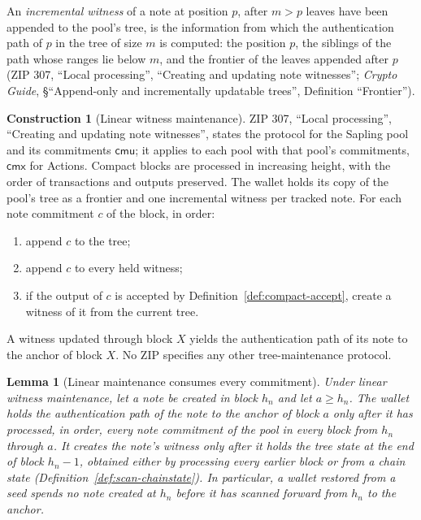 \documentclass[11pt,a4paper]{article}
\newtheorem{lemma}[theorem]{Lemma}
\theoremstyle{definition}
\newtheorem{construction}[theorem]{Construction}
\newcommand{\cmx}{\mathsf{cmx}}
\begin{document}
An \emph{incremental witness} of a note at position $p$, after $m > p$
leaves have been appended to the pool's tree, is the information from which
the authentication path of $p$ in the tree of size $m$ is computed: the
position $p$, the siblings of the path whose ranges lie below $m$, and the
frontier of the leaves appended after $p$ (ZIP 307, ``Local processing'',
``Creating and updating note witnesses''; \emph{Crypto Guide},
\S``Append-only and incrementally updatable trees'', Definition
``Frontier'').

\begin{construction}[Linear witness maintenance]
ZIP 307, ``Local processing'', ``Creating and updating note witnesses'',
states the protocol for the Sapling pool and its commitments
$\mathsf{cmu}$; it applies to each pool with that pool's commitments,
$\cmx$ for Actions. Compact blocks are processed in increasing height, with
the order of transactions and outputs preserved. The wallet holds its copy
of the pool's tree as a frontier and one incremental witness per tracked
note. For each note commitment $c$ of the block, in order:
\begin{enumerate}[label=(\roman*)]
\item append $c$ to the tree;
\item append $c$ to every held witness;
\item if the output of $c$ is accepted by
  Definition~\ref{def:compact-accept}, create a witness of it from the
  current tree.
\end{enumerate}
A witness updated through block $X$ yields the authentication path of its
note to the anchor of block $X$. No ZIP specifies any other
tree-maintenance protocol.
\end{construction}

\begin{lemma}[Linear maintenance consumes every commitment]%
\label{lem:tree-linear}
Under linear witness maintenance, let a note be created in block $h_n$ and
let $a \ge h_n$. The wallet holds the authentication path of the note to
the anchor of block $a$ only after it has processed, in order, every note
commitment of the pool in every block from $h_n$ through $a$. It creates
the note's witness only after it holds the tree state at the end of block
$h_n - 1$, obtained either by processing every earlier block or from a chain
state (Definition~\ref{def:scan-chainstate}). In particular, a wallet
restored from a seed spends no note created at $h_n$ before it has scanned
forward from $h_n$ to the anchor.
\end{lemma}
\end{document}
